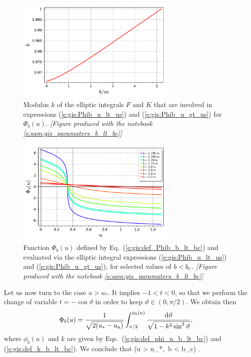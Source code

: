 \begin{figure}
\centerline{\includegraphics[width=0.7\textwidth]{gis_k_b_lt_bc.pdf}}
\caption[]{\label{f:gis:k_b_lt_bc} \footnotesize
Modulus $k$ of the elliptic integrals $F$ and $K$ that are involved
in expressions (\ref{e:gis:Phib_u_lt_us}) and (\ref{e:gis:Phib_u_gt_us})
for $\Phi_b(u)$.
\textsl{[Figure produced with the notebook \ref{s:sam:gis_paramaters_b_lt_bc}]}
}
\end{figure}

\begin{figure}
\centerline{\includegraphics[width=0.7\textwidth]{gis_Phib_b_lt_bc.pdf}}
\caption[]{\label{f:gis:Phib_b_lt_bc} \footnotesize
Function $\Phi_b(u)$ defined by Eq.~(\ref{e:gis:def_Phib_b_lt_bc}) and
evaluated via the elliptic integral expressions (\ref{e:gis:Phib_u_lt_us})
and (\ref{e:gis:Phib_u_gt_us}),
for selected values of $b < b_{\rm c}$.
\textsl{[Figure produced with the notebook \ref{s:sam:gis_paramaters_b_lt_bc}]}
}
\end{figure}

Let us now turn to the case $u>u_*$. It implies $-1 < t < 0$, so that
we perform the change of variable $t = -\cos\vartheta$ in order to keep
$\vartheta\in(0,\pi/2)$. We obtain then
\[
    \Phi_b(u) =  \frac{1}{\sqrt{2(u_* - u_{\rm n})}} \int_{\pi/2}^{\phi_b(u)}
        \frac{\mathrm{d}\vartheta}{\sqrt{1 - k^2 \sin^2\vartheta}} ,
\]
where $\phi_b(u)$ and $k$ are given by Eqs.~(\ref{e:gis:def_phi_u_b_lt_bc})
and (\ref{e:gis:def_k_b_lt_bc}). We conclude that
\be \label{e:gis:Phib_u_gt_us}
    \qquad (u > u_*,\ b < b_{\rm c}) .
\ee

